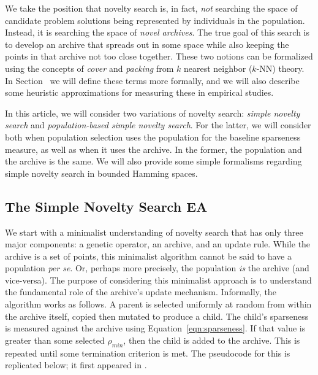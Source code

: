 \documentclass[twoside]{article}
\begin{document}
We take the position that novelty search is, in fact, \emph{not} searching the space of candidate problem solutions being represented by individuals in the population.  Instead, it is searching the space of \emph{novel archives}.  The true goal of this search is to develop an archive that spreads out in some space while also keeping the points in that archive not too close together.  These two notions can be formalized using the concepts of \emph{cover} and \emph{packing} from $k$ nearest neighbor ($k$-NN) theory.  In Section~\pageref{subsec:knn} we will define these terms more formally, and we will also describe some heuristic approximations for measuring these in empirical studies.

In this article, we will consider two variations of novelty search:  \emph{simple novelty search} and \emph{population-based simple novelty search}.  For the latter, we will consider both when population selection uses the population for the baseline sparseness measure, as well as when it uses the archive.   In the former, the population and the archive is the same.  We will also provide some simple formalisms regarding  simple novelty search in bounded Hamming spaces.

\subsection{The Simple Novelty Search EA}
\label{subsec:sns}

We start with a minimalist understanding of novelty search that has only three major components: a genetic operator, an archive, and an update rule.  While the archive is a set of points, this minimalist algorithm cannot be said to have a population \textit{per se}.  Or, perhaps more precisely, the population \emph{is} the archive (and vice-versa).  The purpose of considering this minimalist approach is to understand the fundamental role of the archive's update mechanism.  Informally, the algorithm works as follows.  A parent is selected uniformly at random from within the archive itself, copied then mutated to produce a child.  The child's sparseness is measured against the archive using Equation~\ref{eqn:sparseness}.  If that value is greater than some selected $\rho_{min}$, then the child is added to the archive.  This is repeated until some termination criterion is met.  The pseudocode for this is replicated below; it first appeared in \citet{Wiegand2020flairs}.
\end{document}
